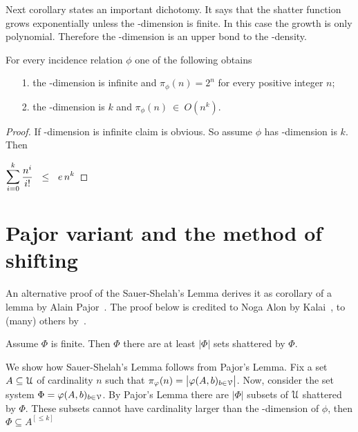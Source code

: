\documentclass[sputnik.tex]{subfiles}
\begin{document}
Next corollary states an important dichotomy.
It says that the shatter function grows exponentially unless the \vc-dimension is finite.
In this case the growth is only polynomial.
Therefore the \vc-dimension is an upper bond to the \vc-density.

\begin{corollary}\label{coroll_Sauer}
For every incidence relation $\phi$ one of the following obtains
\begin{itemize}
 \item[1.] the \vc-dimension is infinite and $\pi_\phi(n)=2^n$ for every positive integer $n$;
 \item[2.] the \vc-dimension is $k$ and $\pi_\phi(n)\ \in\ O(n^k)$.
\end{itemize}
\end{corollary}
\begin{proof}
If \vc-dimension is infinite claim  is obvious.
So assume $\phi$ has \vc-dimension is $k$.
Then

\medrel{\le}$\displaystyle\bigsum^k_{i=0}\frac{n^i}{i!}\medrel{\le}e\,n^k$%
\end{proof}

% 

\section{Pajor variant and the method of shifting}

An alternative proof of the Sauer-Shelah's Lemma derives it as corollary of a lemma by Alain Pajor~\cite{pajor}.
The proof below is credited to Noga Alon by Kalai~\cite{kalai}, to (many) others by~\cite{ARS}.

\begin{proposition}\label{prop_Pajor}
Assume $\Phi$ is finite.
Then $\Phi$ there are at least $|\Phi|$ sets shattered by $\Phi$.
\end{proposition}

We show how Sauer-Shelah's Lemma follows from Pajor's Lemma.
Fix a set $A\subseteq\EuScript U$ of cardinality $n$ such that $\pi_\varphi(n)=\big|\varphi(A,b)_{b\in\EuScript V}\big|$.
Now, consider the set system $\Phi=\varphi(A,b)_{b\in\EuScript V}$.
By Pajor's Lemma there are $|\Phi|$ subsets of $\EuScript U$ shattered by $\Phi$.
These subsets cannot have cardinality larger than the \vc-dimension of $\phi$, then $\Phi\subseteq A^{[\le k]}$
\end{document}
